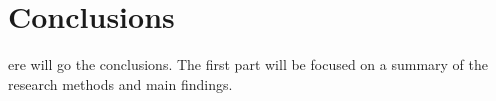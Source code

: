 %
%
\let\textcircled=\pgftextcircled
\chapter{Conclusions}
\label{chap:conc}

ere will go the  conclusions. The first part will be focused on a summary of the research methods and main findings.